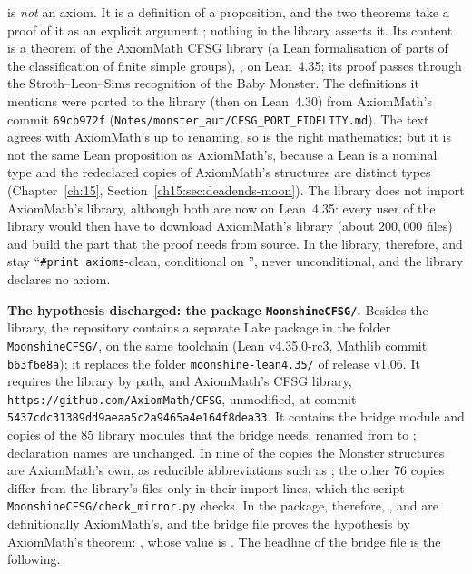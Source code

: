  is \emph{not} an axiom. It is a definition of a proposition, and the two theorems take a proof of it
as an explicit argument ; nothing in the library asserts it. Its content is a theorem of the AxiomMath CFSG
library (a Lean formalisation of parts of the classification of finite simple groups),
, on Lean~4.35; its proof passes through the
Stroth--Leon--Sims recognition of the Baby Monster. The definitions it mentions were ported to the library (then on
Lean~4.30) from AxiomMath's commit \texttt{69cb972f} (\texttt{Notes/monster\_aut/CFSG\_PORT\_FIDELITY.md}). The text agrees with
AxiomMath's up to renaming, so  is the right mathematics; but it is not the same Lean proposition as
AxiomMath's, because a Lean  is a nominal type and the redeclared copies of AxiomMath's structures are
distinct types (Chapter~\ref{ch:15}, Section~\ref{ch15:sec:deadends-moon}). The library does not import AxiomMath's
library, although both are now on Lean~4.35: every user of the library would then have to download AxiomMath's
library (about $200{,}000$ files) and build the part that the proof needs from source. In the library, therefore,
 and  stay ``\texttt{\#print axioms}-clean, conditional on
'', never unconditional, and the library declares no axiom.

\textbf{The hypothesis discharged: the package \texttt{MoonshineCFSG/}.} Besides the library, the repository contains a
separate Lake package in the folder \texttt{MoonshineCFSG/}, on the same toolchain (Lean v4.35.0-rc3, Mathlib commit
\texttt{b63f6e8a}); it replaces the folder \texttt{moonshine-lean4.35/} of release v1.06. It requires the library
 by path, and AxiomMath's CFSG library, \texttt{https://github.com/AxiomMath/CFSG}, unmodified, at commit
\texttt{5437cdc31389dd9aeaa5c2a9465a4e164f8dea33}. It contains the bridge module
 and copies of the $85$ library modules that the bridge needs, renamed from
 to ; declaration names are unchanged. In nine of the copies the Monster
structures are AxiomMath's own, as reducible abbreviations such as ;
the other $76$ copies differ from the library's files only in their import lines, which the script
\texttt{MoonshineCFSG/check\_mirror.py} checks. In the package, therefore, ,  and
 are definitionally AxiomMath's, and the bridge file proves the hypothesis by AxiomMath's theorem:
, whose value is . The headline of the bridge file is the following.

